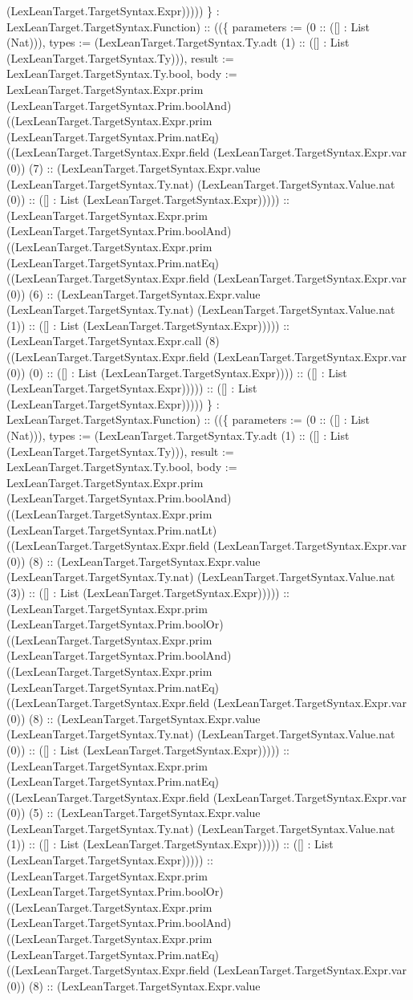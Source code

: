 \documentclass[11pt]{article}
\begin{document}
(LexLeanTarget.TargetSyntax.Expr))))) \} : LexLeanTarget.TargetSyntax.Function) :: ((\{ parameters := (0 :: ([] : List (Nat))), types := (LexLeanTarget.TargetSyntax.Ty.adt (1) :: ([] : List (LexLeanTarget.TargetSyntax.Ty))), result := LexLeanTarget.TargetSyntax.Ty.bool, body := LexLeanTarget.TargetSyntax.Expr.prim (LexLeanTarget.TargetSyntax.Prim.boolAnd) ((LexLeanTarget.TargetSyntax.Expr.prim (LexLeanTarget.TargetSyntax.Prim.natEq) ((LexLeanTarget.TargetSyntax.Expr.field (LexLeanTarget.TargetSyntax.Expr.var (0)) (7) :: (LexLeanTarget.TargetSyntax.Expr.value (LexLeanTarget.TargetSyntax.Ty.nat) (LexLeanTarget.TargetSyntax.Value.nat (0)) :: ([] : List (LexLeanTarget.TargetSyntax.Expr))))) :: (LexLeanTarget.TargetSyntax.Expr.prim (LexLeanTarget.TargetSyntax.Prim.boolAnd) ((LexLeanTarget.TargetSyntax.Expr.prim (LexLeanTarget.TargetSyntax.Prim.natEq) ((LexLeanTarget.TargetSyntax.Expr.field (LexLeanTarget.TargetSyntax.Expr.var (0)) (6) :: (LexLeanTarget.TargetSyntax.Expr.value (LexLeanTarget.TargetSyntax.Ty.nat) (LexLeanTarget.TargetSyntax.Value.nat (1)) :: ([] : List (LexLeanTarget.TargetSyntax.Expr))))) :: (LexLeanTarget.TargetSyntax.Expr.call (8) ((LexLeanTarget.TargetSyntax.Expr.field (LexLeanTarget.TargetSyntax.Expr.var (0)) (0) :: ([] : List (LexLeanTarget.TargetSyntax.Expr)))) :: ([] : List (LexLeanTarget.TargetSyntax.Expr))))) :: ([] : List (LexLeanTarget.TargetSyntax.Expr))))) \} : LexLeanTarget.TargetSyntax.Function) :: ((\{ parameters := (0 :: ([] : List (Nat))), types := (LexLeanTarget.TargetSyntax.Ty.adt (1) :: ([] : List (LexLeanTarget.TargetSyntax.Ty))), result := LexLeanTarget.TargetSyntax.Ty.bool, body := LexLeanTarget.TargetSyntax.Expr.prim (LexLeanTarget.TargetSyntax.Prim.boolAnd) ((LexLeanTarget.TargetSyntax.Expr.prim (LexLeanTarget.TargetSyntax.Prim.natLt) ((LexLeanTarget.TargetSyntax.Expr.field (LexLeanTarget.TargetSyntax.Expr.var (0)) (8) :: (LexLeanTarget.TargetSyntax.Expr.value (LexLeanTarget.TargetSyntax.Ty.nat) (LexLeanTarget.TargetSyntax.Value.nat (3)) :: ([] : List (LexLeanTarget.TargetSyntax.Expr))))) :: (LexLeanTarget.TargetSyntax.Expr.prim (LexLeanTarget.TargetSyntax.Prim.boolOr) ((LexLeanTarget.TargetSyntax.Expr.prim (LexLeanTarget.TargetSyntax.Prim.boolAnd) ((LexLeanTarget.TargetSyntax.Expr.prim (LexLeanTarget.TargetSyntax.Prim.natEq) ((LexLeanTarget.TargetSyntax.Expr.field (LexLeanTarget.TargetSyntax.Expr.var (0)) (8) :: (LexLeanTarget.TargetSyntax.Expr.value (LexLeanTarget.TargetSyntax.Ty.nat) (LexLeanTarget.TargetSyntax.Value.nat (0)) :: ([] : List (LexLeanTarget.TargetSyntax.Expr))))) :: (LexLeanTarget.TargetSyntax.Expr.prim (LexLeanTarget.TargetSyntax.Prim.natEq) ((LexLeanTarget.TargetSyntax.Expr.field (LexLeanTarget.TargetSyntax.Expr.var (0)) (5) :: (LexLeanTarget.TargetSyntax.Expr.value (LexLeanTarget.TargetSyntax.Ty.nat) (LexLeanTarget.TargetSyntax.Value.nat (1)) :: ([] : List (LexLeanTarget.TargetSyntax.Expr))))) :: ([] : List (LexLeanTarget.TargetSyntax.Expr))))) :: (LexLeanTarget.TargetSyntax.Expr.prim (LexLeanTarget.TargetSyntax.Prim.boolOr) ((LexLeanTarget.TargetSyntax.Expr.prim (LexLeanTarget.TargetSyntax.Prim.boolAnd) ((LexLeanTarget.TargetSyntax.Expr.prim (LexLeanTarget.TargetSyntax.Prim.natEq) ((LexLeanTarget.TargetSyntax.Expr.field (LexLeanTarget.TargetSyntax.Expr.var (0)) (8) :: (LexLeanTarget.TargetSyntax.Expr.value 
\end{document}
